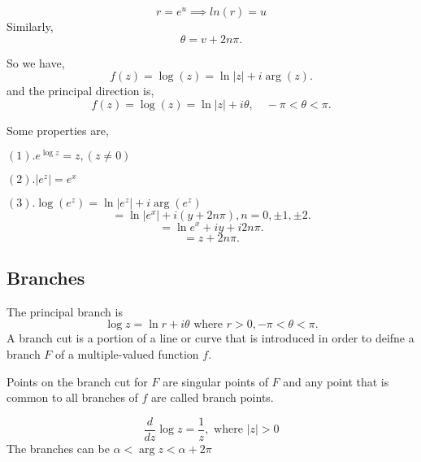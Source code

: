 $$r = e^u \implies ln(r) = u$$
Similarly, \[
\theta = v + 2n\pi
.\] 

So we have, \[
f(z) = \log(z) = \ln|z| + i\arg(z)
.\] 
and the principal direction is, \[
f(z) = \log(z) = \ln|z| + i\theta, \quad -\pi < \theta < \pi
.\] 



Some properties are, 

   $(1). e^{\log z} = z, (z \neq 0)$

   $(2). |e^z| = e^x$
   
   $(3). \log(e^z) = \ln|e^z| + i\arg(e^z)$
\[
= \ln|e^x| + i(y + 2n\pi), n = 0, \pm 1, \pm 2
.\] 
\[
= \ln e^x + iy + i 2 n \pi
.\] 
\[
= z + 2n\pi
.\] 

\subsection*{Branches}
The principal branch is \[
   \log z = \ln r + i \theta \text{ where } r > 0, -\pi < \theta < \pi
.\] 
A branch cut is a portion of a line or curve that is introduced in order to deifne a branch $F$ of a multiple-valued function $f$.

Points on the branch cut for $F$ are singular points of $F$ and any point that is common to all branches of $f$ are called branch points.

\begin{eg}
   \[
      \frac{d}{dz} \log z = \frac{1}{z}, \text{ where } |z | > 0
\]
The branches can be $\alpha < \arg z < \alpha + 2\pi$
\end{eg}





